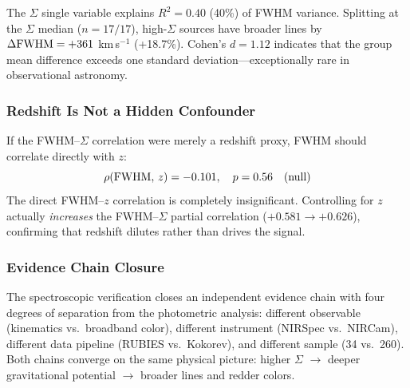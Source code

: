 \documentclass[apj,twocolumn,longbibliography,linenumbers]{aastex701}
\begin{document}
\begin{table}[h]
\caption{Statistical Tests for FWHM--$\Sigma$ Correlation (Sample~B, $N = 34$)}
\label{tab:fwhm_stats}
\centering
\small
{}
\end{table}

The $\Sigma$ single variable explains $R^2 = 0.40$ (40\%) of FWHM variance. Splitting at the $\Sigma$ median ($n = 17/17$), high-$\Sigma$ sources have broader lines by $\Delta{\rm FWHM} = +361$ km\,s$^{-1}$ (+18.7\%). Cohen's $d = 1.12$ indicates that the group mean difference exceeds one standard deviation---exceptionally rare in observational astronomy.

\subsubsection{Redshift Is Not a Hidden Confounder}

If the FWHM--$\Sigma$ correlation were merely a redshift proxy, FWHM should correlate directly with $z$:
\begin{equation}
\rho({\rm FWHM},\, z) = -0.101, \quad p = 0.56 \quad \text{(null)}
\end{equation}
The direct FWHM--$z$ correlation is completely insignificant. Controlling for $z$ actually \textit{increases} the FWHM--$\Sigma$ partial correlation ($+0.581 \to +0.626$), confirming that redshift dilutes rather than drives the signal.

\subsubsection{Evidence Chain Closure}

The spectroscopic verification closes an independent evidence chain with four degrees of separation from the photometric analysis: different observable (kinematics vs.\ broadband color), different instrument (NIRSpec vs.\ NIRCam), different data pipeline (RUBIES vs.\ Kokorev), and different sample (34 vs.\ 260). Both chains converge on the same physical picture: higher $\Sigma$ $\to$ deeper gravitational potential $\to$ broader lines and redder colors.
\end{document}
